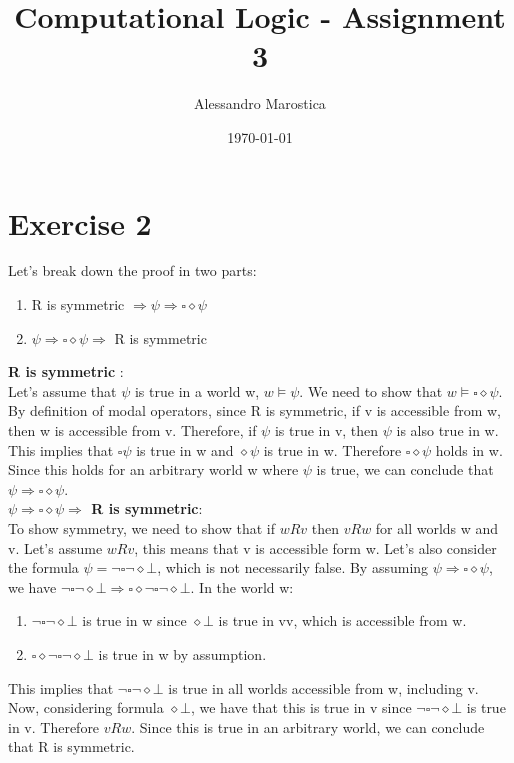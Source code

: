 \documentclass[11pt]{exam}
\title{Computational Logic - Assignment 3}
\author{Alessandro Marostica}
\date{\today}
\begin{document}
\maketitle
\section*{Exercise 2}
Let's break down the proof in two parts:
\begin{enumerate}
    \item R is symmetric \(\Rightarrow \psi \Rightarrow \square \diamond \psi\)
    \item \(\psi \Rightarrow \square \diamond \psi \Rightarrow\) R is symmetric
\end{enumerate}
\textbf{R is symmetric} \boldmath{\(\Rightarrow \psi \Rightarrow \square \diamond \psi\)}: \\
Let's assume that \(\psi\) is true in a world w, \(w \vDash \psi\). We need to show that \(w \vDash \square \diamond \psi\).
By definition of modal operators, since R is symmetric, if v is accessible from w, then w is accessible from v. Therefore, if \(\psi\) is true in v, then \(\psi\) is also true in w.
This implies that \(\square \psi\) is true in w and \(\diamond \psi\) is true in w. Therefore \(\square \diamond \psi\) holds in w.
Since this holds for an arbitrary world w where \(\psi\) is true, we can conclude that \(\psi \Rightarrow \square \diamond \psi\). \\
\textbf{\(\psi \Rightarrow \square \diamond \psi \Rightarrow\) R is symmetric}: \\
To show symmetry, we need to show that if \(wRv\) then \(vRw\) for all worlds w and v.
Let's assume \(wRv\), this means that v is accessible form w.
Let's also consider the formula \(\psi = \neg \square \neg \diamond \bot \), which is not necessarily false. By assuming \(\psi \Rightarrow \square \diamond \psi\), we have \(\neg \square \neg \diamond \bot \Rightarrow \square \diamond \neg \square \neg \diamond \bot\).
In the world w:
\begin{enumerate}
    \item \(\neg \square \neg \diamond \bot\) is true in w since \(\diamond \bot\) is true in vv, which is accessible from w.
    \item \(\square \diamond \neg \square \neg \diamond \bot\) is true in w by assumption.
\end{enumerate}
This implies that \(\neg \square \neg \diamond \bot\) is true in all worlds accessible from w, including v.
Now, considering formula \(\diamond \bot\), we have that this is true in v since \(\neg \square \neg \diamond \bot\) is true in v. Therefore \(vRw\).
Since this is true in an arbitrary world, we can conclude that R is symmetric.
\end{document}
